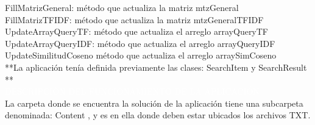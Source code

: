 \documentclass[10pt,a4paper]{article}
\begin{document}
FillMatrizGeneral: método que actualiza la matriz mtzGeneral\\

FillMatrizTFIDF: método que actualiza la matriz mtzGeneralTFIDF\\

UpdateArrayQueryTF: método que actualiza el arreglo arrayQueryTF\\

UpdateArrayQueryIDF: método que actualiza el arreglo arrayQueryIDF\\

UpdateSimilitudCoseno método que actualiza el arreglo arraySimCoseno\\

**La aplicación tenía definida previamente las clases: SearchItem y SearchResult **\\

\textcolor{White}{\colorbox{NavyBlue}{DESCRIPCIÓN DEL FUNCIONAMIENTO DE LA APLICACIÓN}}\\

La carpeta donde se encuentra la solución de la aplicación tiene una subcarpeta denominada: 
Content , y es en ella donde deben estar ubicados los archivos TXT.\\
\end{document}
